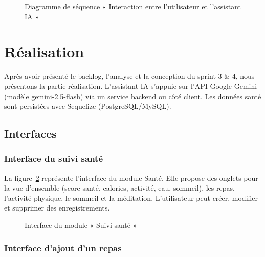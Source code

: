 \begin{figure}[H]
\centering
\caption{Diagramme de séquence « Interaction entre l'utilisateur et l'assistant IA »}
\label{authSE18}
\end{figure}

\section{Réalisation}

Après avoir présenté le backlog, l'analyse et la conception du sprint 3 \& 4, nous présentons la partie réalisation. L'assistant IA s'appuie sur l'API Google Gemini (modèle gemini-2.5-flash) via un service backend ou côté client. Les données santé sont persistées avec Sequelize (PostgreSQL/MySQL).

\subsection{Interfaces}

\subsubsection{Interface du suivi santé}

La figure~\ref{fig:health} représente l'interface du module Santé. Elle propose des onglets pour la vue d'ensemble (score santé, calories, activité, eau, sommeil), les repas, l'activité physique, le sommeil et la méditation. L'utilisateur peut créer, modifier et supprimer des enregistrements.

\begin{figure}[H]
\centering
\caption{Interface du module « Suivi santé »}
\label{fig:health}
\end{figure}

\subsubsection{Interface d'ajout d'un repas}

